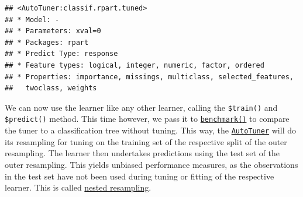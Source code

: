 \documentclass[]{scrbook}
\newenvironment{Shaded}{\begin{snugshade}}{\end{snugshade}}
\newcommand{\DataTypeTok}[1]{\textcolor[rgb]{0.13,0.29,0.53}{#1}}
\newcommand{\DecValTok}[1]{\textcolor[rgb]{0.00,0.00,0.81}{#1}}
\newcommand{\FloatTok}[1]{\textcolor[rgb]{0.00,0.00,0.81}{#1}}
\newcommand{\KeywordTok}[1]{\textcolor[rgb]{0.13,0.29,0.53}{\textbf{#1}}}
\newcommand{\NormalTok}[1]{#1}
\newcommand{\OperatorTok}[1]{\textcolor[rgb]{0.81,0.36,0.00}{\textbf{#1}}}
\newcommand{\StringTok}[1]{\textcolor[rgb]{0.31,0.60,0.02}{#1}}
\renewenvironment{Shaded} {\begin{snugshade}\small} {\end{snugshade}}
\begin{document}
\begin{Shaded}
\end{Shaded}

\begin{verbatim}
## <AutoTuner:classif.rpart.tuned>
## * Model: -
## * Parameters: xval=0
## * Packages: rpart
## * Predict Type: response
## * Feature types: logical, integer, numeric, factor, ordered
## * Properties: importance, missings, multiclass, selected_features,
##   twoclass, weights
\end{verbatim}

We can now use the learner like any other learner, calling the \texttt{\$train()} and \texttt{\$predict()} method.
This time however, we pass it to \href{https://mlr3.mlr-org.com/reference/benchmark.html}{\texttt{benchmark()}} to compare the tuner to a classification tree without tuning.
This way, the \href{https://mlr3tuning.mlr-org.com/reference/AutoTuner.html}{\texttt{AutoTuner}} will do its resampling for tuning on the training set of the respective split of the outer resampling.
The learner then undertakes predictions using the test set of the outer resampling.
This yields unbiased performance measures, as the observations in the test set have not been used during tuning or fitting of the respective learner.
This is called \protect\hyperlink{nested-resampling}{nested resampling}.
\end{document}
